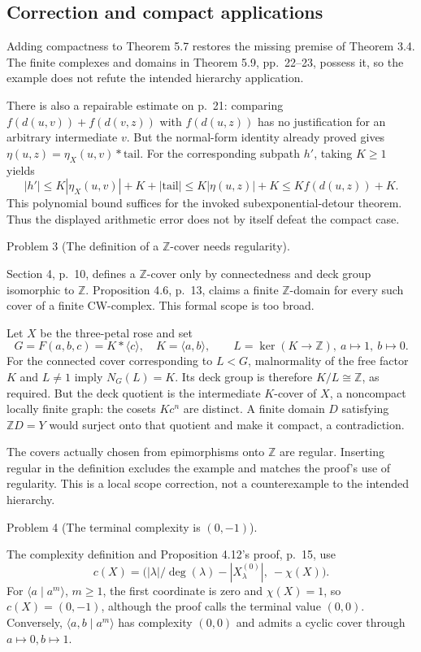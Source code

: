 \documentclass[10pt]{article}
\begin{document}
\subsection*{Correction and compact applications}
Adding compactness to Theorem 5.7 restores the missing premise of Theorem 3.4. The finite complexes and domains in Theorem 5.9, pp. 22–23, possess it, so the example does not refute the intended hierarchy application.\par
There is also a repairable estimate on p. 21: comparing \(f(d(u,v))+f(d(v,z))\) with \(f(d(u,z))\) has no justification for an arbitrary intermediate \(v\). But the normal-form identity already proved gives \(\eta(u,z)=\eta_X(u,v)*\mathrm{tail}\). For the corresponding subpath \(h'\), taking \(K\ge1\) yields \[|h'|\le K|\eta_X(u,v)|+K+|\mathrm{tail}|
       \le K|\eta(u,z)|+K
       \le K f(d(u,z))+K.\] This polynomial bound suffices for the invoked subexponential-detour theorem. Thus the displayed arithmetic error does not by itself defeat the compact case.\par
Problem 3 (The definition of a \(\mathbb Z\)-cover needs regularity).\par
Section 4, p. 10, defines a \(\mathbb Z\)-cover only by connectedness and deck group isomorphic to \(\mathbb Z\). Proposition 4.6, p. 13, claims a finite \(\mathbb Z\)-domain for every such cover of a finite CW-complex. This formal scope is too broad.\par
Let \(X\) be the three-petal rose and set \[G=F(a,b,c)=K*\langle c\rangle,\quad K=\langle a,b\rangle,
 \qquad L=\ker(K\to\mathbb Z),\ a\mapsto1,\ b\mapsto0 .\] For the connected cover corresponding to \(L<G\), malnormality of the free factor \(K\) and \(L\ne1\) imply \(N_G(L)=K\). Its deck group is therefore \(K/L\cong\mathbb Z\), as required. But the deck quotient is the intermediate \(K\)-cover of \(X\), a noncompact locally finite graph: the cosets \(Kc^n\) are distinct. A finite domain \(D\) satisfying \(\mathbb ZD=Y\) would surject onto that quotient and make it compact, a contradiction.\par
The covers actually chosen from epimorphisms onto \(\mathbb Z\) are regular. Inserting regular in the definition excludes the example and matches the proof’s use of regularity. This is a local scope correction, not a counterexample to the intended hierarchy.\par
Problem 4 (The terminal complexity is \((0,-1)\)).\par
The complexity definition and Proposition 4.12’s proof, p. 15, use \[c(X)=\bigl(|\lambda|/\deg(\lambda)-|X_\lambda^{(0)}|,\ -\chi(X)\bigr).\] For \(\langle a\mid a^m\rangle\), \(m\ge1\), the first coordinate is zero and \(\chi(X)=1\), so \(c(X)=(0,-1)\), although the proof calls the terminal value \((0,0)\). Conversely, \(\langle a,b\mid a^m\rangle\) has complexity \((0,0)\) and admits a cyclic cover through \(a\mapsto0,b\mapsto1\).\par
\end{document}
